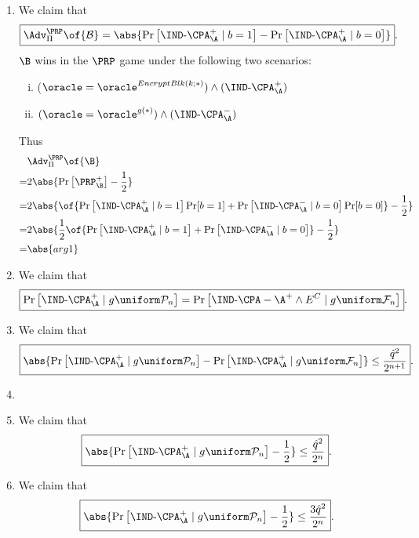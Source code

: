 	\begin{enumerate}
		\item We claim that \[
		\boxed{\Adv_{\Pi}^{\PRP}\of{\mathcal{B}}=\abs{\Pr\left[\IND\text{-}\CPA_\A^+\mid b=1\right]-\Pr\left[\IND\text{-}\CPA_{\A}^+\mid b=0\right]}}.
		\] 
		$\B$ wins in the $\PRP$ game under the following two scenarios: \begin{enumerate}[(i)]
			\item ($\oracle=\oracle^{EncryptBlk(k;*)})\land(\IND\text{-}\CPA_\A^+)$
			\item $(\oracle=\oracle^{g(*)})\land (\IND\text{-}\CPA_\A^-)$
		\end{enumerate} Thus \begin{align*}
			&\Adv_{\Pi}^{\PRP}\of{\B}\\
			=&2\abs{\Pr\left[\PRP_{\B}^+\right]-\frac{1}{2}}\\
			=&2\abs{\of{\Pr\left[\IND\text{-}\CPA_{\A}^+\mid b=1\right]\Pr[b=1]+\Pr\left[\IND\text{-}\CPA_{\A}^-\mid b=0\right]\Pr[b=0]}-\frac{1}{2}}\\
			=&2\abs{\frac{1}{2}\of{\Pr\left[\IND\text{-}\CPA_{\A}^+\mid b=1\right]+\Pr\left[\IND\text{-}\CPA_{\A}^-\mid b=0\right]}-\frac{1}{2}}\\
			=&\abs{arg1}
		\end{align*}
		\vspace{4pt}
		\item We claim that \[
		\boxed{\Pr\left[\IND\text{-}\CPA_{\A}^+\mid g\uniform\mathcal{P}_n\right]=\Pr\left[\IND\text{-}\CPA-\A^+\land E^C\mid g\uniform\mathcal{F}_n\right]}.
		\]
		\item We claim that \[
		\boxed{\abs{\Pr\left[\IND\text{-}\CPA_{\A}^+\mid g\uniform\mathcal{P}_n\right]-\Pr\left[\IND\text{-}\CPA_{\A}^+\mid g\uniform\mathcal{F}_n\right]}\leq\frac{\hat{q}^2}{2^{n+1}}}.
		\]
		\item 
		\item We claim that \[
		\boxed{\abs{\Pr\left[\IND\text{-}\CPA_{\A}^+\mid g\uniform\mathcal{P}_n\right]-\frac{1}{2}}\leq\frac{\hat{q}^2}{2^{n}}}.
		\]
		\item We claim that \[
		\boxed{\abs{\Pr\left[\IND\text{-}\CPA_{\A}^+\mid g\uniform\mathcal{P}_n\right]-\frac{1}{2}}\leq\frac{3\hat{q}^2}{2^{n}}}.
		\]
	\end{enumerate}

